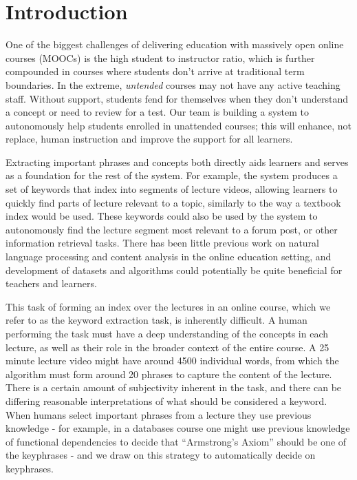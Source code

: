 \section{Introduction}
\label{sec:intro}

One of the biggest challenges of delivering education with massively open online courses (MOOCs) is the high student to instructor ratio, which is further compounded in courses where students don't arrive at traditional term boundaries. In the extreme, \textit{untended} courses may not have any active teaching staff. Without support, students fend for themselves when they don't understand a concept or need to review for a test. Our team is building a system to autonomously help students enrolled in unattended courses; this will enhance, not replace, human instruction and improve the support for all learners.

Extracting important phrases and concepts both directly aids learners and serves as a foundation for the rest of the system. For example, the system produces a set of keywords that index into segments of lecture videos, allowing learners to quickly find parts of lecture relevant to a topic, similarly to the way a textbook index would be used. These keywords could also be used by the system to autonomously find the lecture segment most relevant to a forum post, or other information retrieval tasks. There has been little previous work on natural language processing and content analysis in the online education setting, and development of datasets and algorithms could potentially be quite beneficial for teachers and learners.

This task of forming an index over the lectures in an online course, which we refer to as the keyword extraction task, is inherently difficult. A human performing the task must have a deep understanding of the concepts in each lecture, as well as their role in the broader context of the entire course. A 25 minute lecture video might have around 4500 individual words, from which the algorithm must form around 20 phrases to capture the content of the lecture. There is a certain amount of subjectivity inherent in the task, and there can be differing reasonable interpretations of what should be considered a keyword. When humans select important phrases from a lecture they use previous knowledge - for example, in a databases course one might use previous knowledge of functional dependencies to decide that ``Armstrong's Axiom'' should be one of the keyphrases - and we draw on this strategy to automatically decide on keyphrases.

